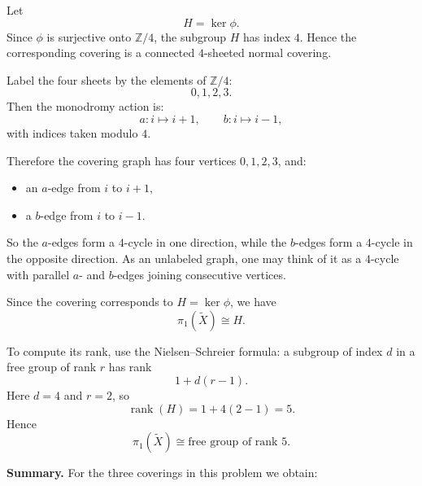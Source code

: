 \documentclass[12pt,a4paper]{article}
\theoremstyle{notespace}
\begin{document}
Let
\[
H=\ker\phi.
\]
Since \(\phi\) is surjective onto \(\mathbb Z/4\), the subgroup \(H\) has index \(4\). Hence the corresponding covering is a connected \(4\)-sheeted normal covering.

Label the four sheets by the elements of \(\mathbb Z/4\):
\[
0,1,2,3.
\]
Then the monodromy action is:
\[
a:i\mapsto i+1,\qquad b:i\mapsto i-1,
\]
with indices taken modulo \(4\).

Therefore the covering graph has four vertices \(0,1,2,3\), and:
\begin{itemize}
	\item an \(a\)-edge from \(i\) to \(i+1\),
	\item a \(b\)-edge from \(i\) to \(i-1\).
\end{itemize}
So the \(a\)-edges form a \(4\)-cycle in one direction, while the \(b\)-edges form a \(4\)-cycle in the opposite direction. As an unlabeled graph, one may think of it as a \(4\)-cycle with parallel \(a\)- and \(b\)-edges joining consecutive vertices.

Since the covering corresponds to \(H=\ker\phi\), we have
\[
\pi_1(\widetilde X)\cong H.
\]

To compute its rank, use the Nielsen--Schreier formula: a subgroup of index \(d\) in a free group of rank \(r\) has rank
\[
1+d(r-1).
\]
Here \(d=4\) and \(r=2\), so
\[
\operatorname{rank}(H)=1+4(2-1)=5.
\]
Hence
\[
\pi_1(\widetilde X)\cong \text{free group of rank }5.
\]

\bigskip

\textbf{Summary.}
For the three coverings in this problem we obtain:
\end{document}
